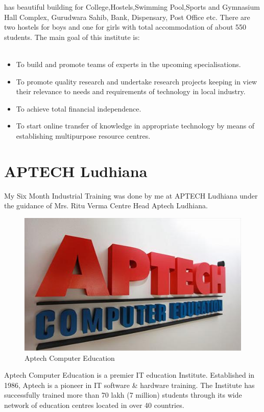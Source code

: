 has beautiful building for College,Hostels,Swimming Pool,Sports and Gymnasium Hall
Complex, Gurudwara Sahib, Bank, Dispensary, Post Office etc. There are two hostels
for boys and one for girls with total accommodation of about 550 students. The main
goal of this institute is:\\\\
\begin{itemize}
\item To build and promote teams of experts in the upcoming specialisations.
\item To promote quality research and undertake research projects keeping in view their
relevance to needs and requirements of technology in local industry.
\item To achieve total financial independence.
\item To start online transfer of knowledge in appropriate technology by means of establishing multipurpose resource centres.
\end{itemize}
\section{APTECH Ludhiana}
My Six Month Industrial Training was done by me at APTECH Ludhiana under the guidance of Mrs. Ritu Verma Centre Head Aptech Ludhiana. 

\begin{figure}[ht]
\centering
\includegraphics[scale=0.9]{images/Aptech.jpg}
\caption{Aptech Computer Education}
\end{figure} 

\noindent Aptech Computer Education is a premier IT
education Institute. Established in 1986, Aptech is a
pioneer in IT software \& hardware training. The Institute has successfully trained more than 70
lakh (7 million) students through its wide network
of education centres located in over 40 countries.\\

